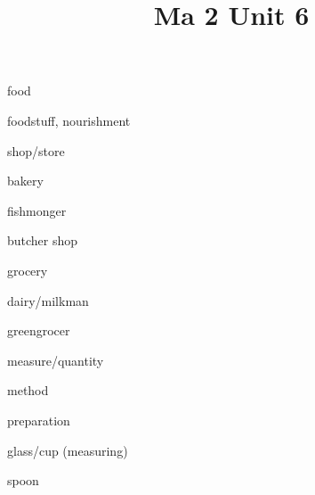 \documentclass[avery5371,grid,frame]{flashcards}
\title{Ma 2 Unit 6}
\begin{document}
\begin{flashcard}{\LARGE food}
\LARGE {}
\end{flashcard}
\begin{flashcard}{\LARGE foodstuff, nourishment}
\LARGE {}
\end{flashcard}
\begin{flashcard}{\LARGE shop/store}
\LARGE {}
\end{flashcard}
\begin{flashcard}{\LARGE bakery}
\LARGE {}
\end{flashcard}
\begin{flashcard}{\LARGE fishmonger}
\LARGE {}
\end{flashcard}
\begin{flashcard}{\LARGE butcher shop}
\LARGE {}
\end{flashcard}
\begin{flashcard}{\LARGE grocery}
\LARGE {}
\end{flashcard}
\begin{flashcard}{\LARGE dairy/milkman}
\LARGE {}
\end{flashcard}
\begin{flashcard}{\LARGE greengrocer}
\LARGE {}
\end{flashcard}
\begin{flashcard}{\LARGE measure/quantity}
\LARGE {}
\end{flashcard}
\begin{flashcard}{\LARGE method}
\LARGE {}
\end{flashcard}
\begin{flashcard}{\LARGE preparation}
\LARGE {}
\end{flashcard}
\begin{flashcard}{\LARGE glass/cup (measuring)}
\LARGE {}
\end{flashcard}
\begin{flashcard}{\LARGE spoon}
\LARGE {}
\end{flashcard}
\end{document}
